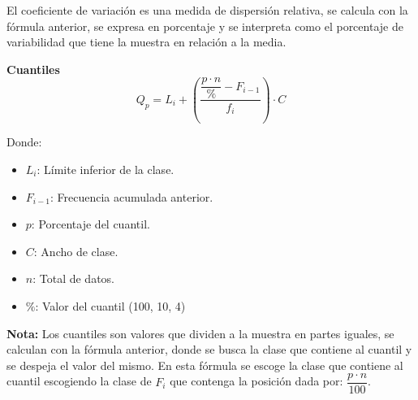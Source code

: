 \documentclass[11pt, a4paper]{article}
\newenvironment{coeficienteDeVariacion}{}{}
\newenvironment{cuantiles}{}{}
\begin{document}
\begin{multicols}{2}
\begin{coeficienteDeVariacion}
        El coeficiente de variación es una medida de dispersión relativa, se calcula con la fórmula anterior, se expresa en porcentaje y se interpreta como el porcentaje de variabilidad que tiene la muestra en relación a la media.
    \end{coeficienteDeVariacion}
    \vspace{2cm}
    \begin{cuantiles}
        \begin{center}
            \textbf{\large Cuantiles}
            \hrulefill
            \begin{equation*}
                Q_p = L_i + \left( \dfrac{\dfrac{p \cdot n}{\%} - F_{i-1}}{f_i} \right) \cdot C
            \end{equation*}
        \end{center}
        \vspace{-1cm}
        Donde:
        \begin{itemize}
            \item $L_i$: Límite inferior de la clase.
            \item $F_{i-1}$: Frecuencia acumulada anterior.
            \item $p$: Porcentaje del cuantil.
            \item $C$: Ancho de clase.
            \item $n$: Total de datos.
            \item $\%$: Valor del cuantil (100, 10, 4)
        \end{itemize}
        \textbf{Nota:}
        Los cuantiles son valores que dividen a la muestra en partes iguales, se calculan con la fórmula anterior, donde se busca la clase que contiene al cuantil y se despeja el valor del mismo. En esta fórmula se escoge la clase que contiene al cuantil escogiendo la clase de $F_i$ que contenga la posición dada por: $\dfrac{p \cdot n}{100}$.
    \end{cuantiles}
    \clearpage
\end{multicols}
\end{document}
